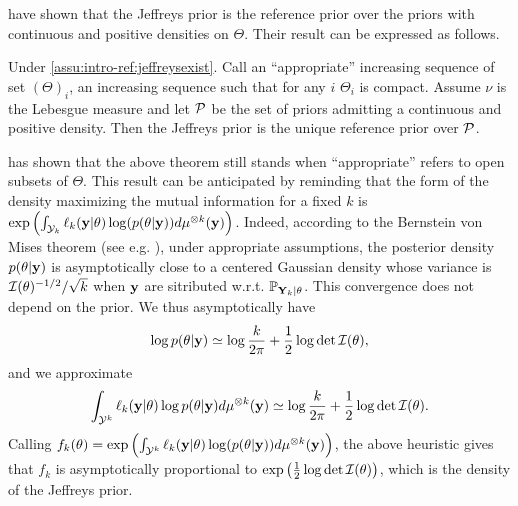 \citet{clarke_jeffreys_1994} have shown that the Jeffreys prior  is the reference prior over the priors with continuous and positive densities on $\Theta$. Their result can be expressed as follows.
    \begin{thm}\label{thm:intro-ref:clarke}
        Under \cref{assu:intro-ref:jeffreysexist}. Call an ``appropriate'' increasing sequence of set $(\Theta)_i$, an increasing sequence such that for any $i$ $\Theta_i$ is compact. Assume $\nu$ is the Lebesgue measure and let $\mathcal{P}$ be the set of priors admitting a continuous and positive density. Then the Jeffreys prior is the unique reference prior over $\mathcal{P}$.
    \end{thm}
\citet{mure_objective_2018} has shown that the above theorem still stands when ``appropriate'' refers to open subsets of $\Theta$. {This result can be anticipated by reminding that the form of the density maximizing the mutual information for a fixed $k$ is $\exp\left(\int_{\mathcal{Y}_k}\ell_k(\mathbf{y}|\theta)\log(p(\theta|\mathbf{y}) ) d\mu^{\otimes k}(\mathbf{y})\right)$. 
Indeed, according to the Bernstein von Mises theorem (see e.g. \cite{van_der_vaart_asymptotic_1992}), under appropriate assumptions, the posterior density $p(\theta|\mathbf{y})$ is asymptotically close  to a %
centered Gaussian density whose  variance is $\mathcal{I}(\theta)^{-1/2}/\sqrt{k}$ when $\mathbf{y}$ are sitributed w.r.t. $\mathbb{P}_{\mathbf{Y}_k|\theta}$.
This convergence does not depend {on} the prior. We thus asymptotically have
    \begin{equation}
        \log p(\theta|\mathbf{y})\simeq \log \frac{k}{2\pi}  +\frac{1}{2}\log\det\mathcal{I}(\theta),
    \end{equation}
and we approximate
\begin{equation}
    \int_{\mathcal{Y}^k} \ell_k(\mathbf{y}|\theta)\log p(\theta|\mathbf{y}) d\mu^{\otimes k}(\mathbf{y})\simeq \log\frac{k}{2\pi} + \frac{1}{2}\log\det\mathcal{I}(\theta).
\end{equation}
Calling $f_k(\theta) = \exp\left(\int_{\mathcal{Y}^k}\ell_k(\mathbf{y}|\theta)\log(p(\theta|\mathbf{y}))d\mu^{\otimes k}(\mathbf{y})  \right)$, the above heuristic gives that $f_k$ is asymptotically proportional to $\exp\left(\frac{1}{2}\log\det\mathcal{I}(\theta)\right)$, which is the density of the Jeffreys prior.}



